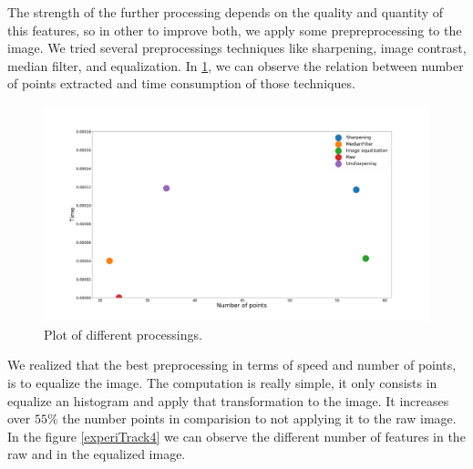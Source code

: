 The strength of the further processing depends on the quality and quantity of this features, so in other to improve both, we apply some prepreprocessing to the image. We tried several preprocessings techniques like sharpening, image contrast, median filter, and equalization. In \ref{experiTrack3}, we can observe the relation between number of points extracted and time consumption of those techniques.




\begin{figure}[H]
\centering         
\includegraphics[width=0.9\linewidth]{tracker/preprocesing.png}
\caption{Plot of different processings.} \label{experiTrack3}
\end{figure}

We realized that the best preprocessing in terms of speed and number of points, is to equalize the image. The computation is really simple, it only consists in equalize an histogram and apply that transformation to the image. It increases over $ 55 \%$ the number points in comparision to not applying it to the raw image. In the figure \ref{experiTrack4} we can observe the different number of features in the raw and in the equalized image.

